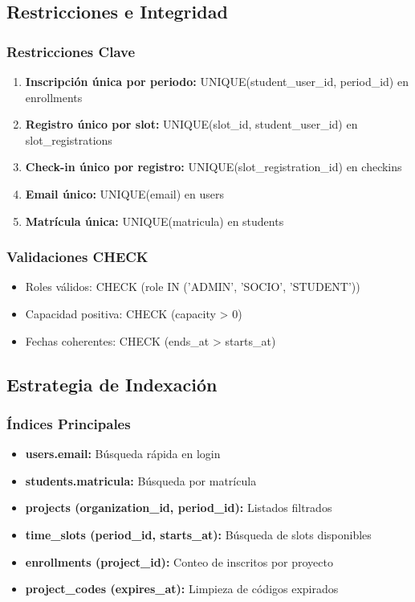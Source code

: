\documentclass[12pt,a4paper]{article}
\begin{document}
\subsection{Restricciones e Integridad}

\subsubsection{Restricciones Clave}

\begin{enumerate}
    \item \textbf{Inscripción única por periodo:} UNIQUE(student\_user\_id, period\_id) en enrollments
    \item \textbf{Registro único por slot:} UNIQUE(slot\_id, student\_user\_id) en slot\_registrations
    \item \textbf{Check-in único por registro:} UNIQUE(slot\_registration\_id) en checkins
    \item \textbf{Email único:} UNIQUE(email) en users
    \item \textbf{Matrícula única:} UNIQUE(matricula) en students
\end{enumerate}

\subsubsection{Validaciones CHECK}

\begin{itemize}[leftmargin=*]
    \item Roles válidos: CHECK (role IN ('ADMIN', 'SOCIO', 'STUDENT'))
    \item Capacidad positiva: CHECK (capacity > 0)
    \item Fechas coherentes: CHECK (ends\_at > starts\_at)
\end{itemize}

\subsection{Estrategia de Indexación}

\subsubsection{Índices Principales}

\begin{itemize}[leftmargin=*]
    \item \textbf{users.email:} Búsqueda rápida en login
    \item \textbf{students.matricula:} Búsqueda por matrícula
    \item \textbf{projects (organization\_id, period\_id):} Listados filtrados
    \item \textbf{time\_slots (period\_id, starts\_at):} Búsqueda de slots disponibles
    \item \textbf{enrollments (project\_id):} Conteo de inscritos por proyecto
    \item \textbf{project\_codes (expires\_at):} Limpieza de códigos expirados
\end{itemize}
\end{document}
